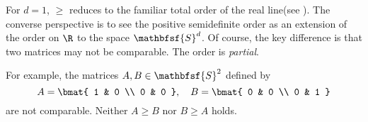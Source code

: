 For $d = 1$, $\geq$ reduces to the familiar total order of the real line(see ).
The converse perspective is to see the positive semidefinite order as an extension of the order on $\R $ to the space $\mathbfsf{S} ^d$.
Of course, the key difference is that two matrices may not be comparable.
The order is \textit{partial}.

For example, the matrices $A, B \in \mathbfsf{S} ^2$ defined by
\[
A = \bmat{
1 & 0 \\
0 & 0
},
\quad
B = \bmat{
0 & 0 \\
0 & 1
}
\]
are not comparable.
Neither $A \geq B$ nor $B \geq A$ holds.

\blankpage